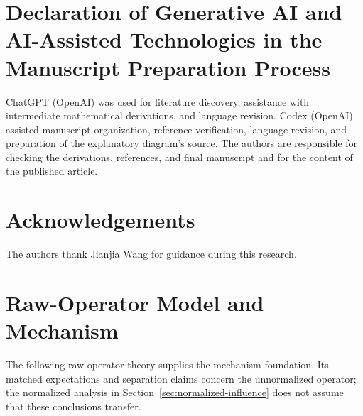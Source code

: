 \documentclass[preprint,11pt]{elsarticle}
\begin{document}
\section*{Declaration of Generative AI and AI-Assisted Technologies
in the Manuscript Preparation Process}
ChatGPT (OpenAI) was used for literature discovery, assistance with
intermediate mathematical derivations, and language revision.
Codex (OpenAI) assisted manuscript organization, reference verification,
language revision, and preparation of the explanatory diagram's source.
The authors are responsible for checking the derivations, references,
and final manuscript and for the content of the published article.

\section*{Acknowledgements}
The authors thank Jianjia Wang for guidance during this research.




\clearpage
\appendix
\renewcommand{\thesection}{\Alph{section}}
\makeatletter
\renewcommand{\@seccntformat}[1]{\ifstrequal{#1}{section}{Appendix~}{}\csname the#1\endcsname.\quad}
\makeatother
{}

\section{Raw-Operator Model and Mechanism}\label{sec:raw-mechanism}\label{sec:model}
The following raw-operator theory supplies the mechanism foundation. Its matched expectations and separation claims concern the unnormalized operator; the normalized analysis in Section~\ref{sec:normalized-influence} does not assume that these conclusions transfer.
\end{document}
